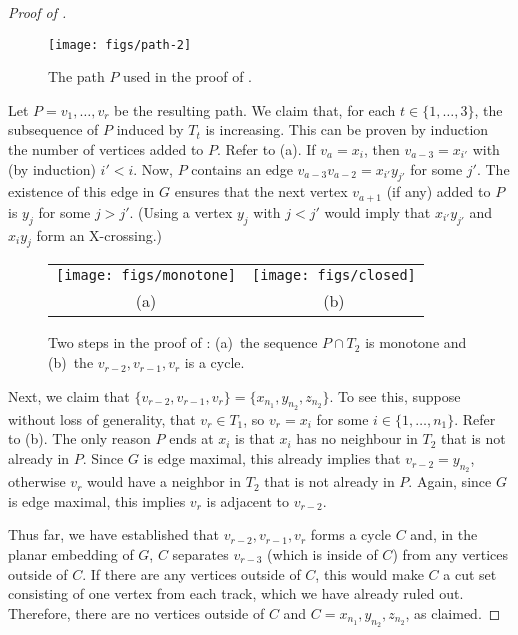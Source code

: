 \documentclass{patmorin}
\begin{document}
\begin{proof}[Proof of ]
  \begin{figure}
     \begin{center}
        \texttt{[image: figs/path-2]}
     \end{center}
     \caption{The path $P$ used in the proof of .}
  \end{figure}

  Let $P=v_1,\ldots,v_r$ be the resulting path.  We claim that,
  for each $t\in \{1,\ldots,3\}$, the subsequence of $P$ induced by
  $T_t$ is increasing. This can be proven by induction the number of
  vertices added to $P$. Refer to (a).  If $v_a=x_i$,
  then $v_{a-3}=x_{i'}$ with (by induction) $i'< i$.  Now, $P$ contains
  an edge $v_{a-3}v_{a-2}=x_{i'}y_{j'}$ for some $j'$.  The existence of
  this edge in $G$ ensures that the next vertex $v_{a+1}$ (if any) added
  to $P$ is $y_j$ for some $j > j'$.  (Using a vertex $y_j$ with $j <
  j'$ would imply that $x_{i'}y_{j'}$ and $x_iy_j$ form an X-crossing.)

  \begin{figure}
    \begin{center}
       \begin{tabular}{cc}
         \texttt{[image: figs/monotone]} & \texttt{[image: figs/closed]} \\
         (a) & (b)
       \end{tabular}
    \end{center}
    \caption{Two steps in the proof of : (a)~the sequence $P\cap T_2$ is monotone and (b)~the $v_{r-2},v_{r-1},v_r$ is a cycle.}
  \end{figure}


  Next, we claim that
  $\{v_{r-2},v_{r-1},v_{r}\}=\{x_{n_1},y_{n_2},z_{n_2}\}$. To see this,
  suppose without loss of generality, that $v_r\in T_1$, so $v_r=x_i$
  for some $i\in\{1,\ldots,n_1\}$. Refer to (b). The only
  reason $P$ ends at $x_i$ is that $x_i$ has no neighbour in $T_{2}$
  that is not already in $P$.  Since $G$ is edge maximal, this already
  implies that $v_{r-2}=y_{n_2}$, otherwise $v_r$ would have a neighbor
  in $T_2$ that is not already in $P$.  Again, since $G$ is edge maximal,
  this implies $v_r$ is adjacent to $v_{r-2}$.

  Thus far, we have established that $v_{r-2},v_{r-1},v_{r}$ forms a
  cycle $C$ and, in the planar embedding of $G$, $C$ separates $v_{r-3}$
  (which is inside of $C$) from any vertices outside of $C$.  If there are
  any vertices outside of $C$, this would make $C$ a cut set consisting
  of one vertex from each track, which we have already ruled out.
  Therefore, there are no vertices outside of $C$ and 
  $C=x_{n_1},y_{n_2},z_{n_2}$, as claimed.


\end{proof}
\end{document}

